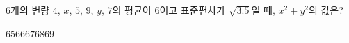 6개의 변량 $4$, $x$, $5$, $9$, $y$, $7$의 평균이 6이고 표준편차가 $\sqrt{3.5}$일 때, $x^2+y^2$의 값은?
\begin{choices32}{$65$}{$66$}{$67$}{$68$}{$69$}\end{choices32}
